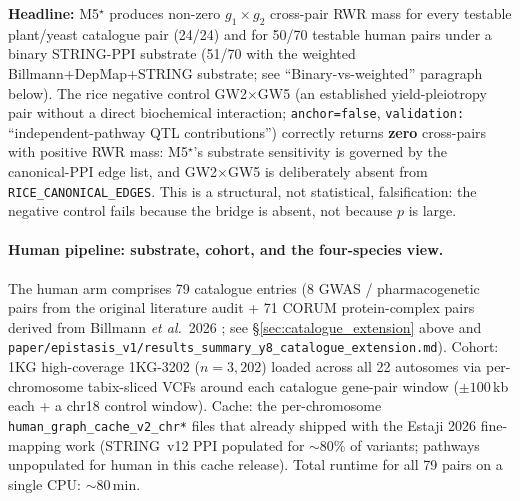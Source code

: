 \textbf{Headline:} M5$^\star$ produces non-zero
$g_1\!\times\!g_2$ cross-pair RWR mass for every testable
plant/yeast catalogue pair (24/24) and for 50/70 testable human pairs
under a binary STRING-PPI substrate (51/70 with the
weighted Billmann+DepMap+STRING substrate; see ``Binary-vs-weighted''
paragraph below). The rice negative control GW2$\times$GW5 (an
established yield-pleiotropy pair without a direct biochemical
interaction; \texttt{anchor=false}, \texttt{validation:}
``independent-pathway QTL contributions'') correctly returns
\textbf{zero} cross-pairs with positive RWR mass: M5$^\star$'s
substrate sensitivity is governed by the canonical-PPI edge list, and
GW2$\times$GW5 is deliberately absent from \texttt{RICE\_CANONICAL\_EDGES}.
This is a structural, not statistical, falsification: the negative
control fails because the bridge is absent, not because $p$ is large.

\paragraph{Human pipeline: substrate, cohort, and the four-species view.}
The human arm comprises 79 catalogue entries (8 GWAS / pharmacogenetic
pairs from the original literature audit + 71 CORUM protein-complex
pairs derived from Billmann \emph{et al.}\ 2026 \cite{billmann2026hap1};
see §\ref{sec:catalogue_extension} above and
\texttt{paper/epistasis\_v1/results\_summary\_y8\_catalogue\_extension.md}).
Cohort: 1KG high-coverage 1KG-3202 ($n=3{,}202$) loaded across all 22
autosomes via per-chromosome tabix-sliced VCFs around each catalogue
gene-pair window ($\pm 100\,$kb each + a chr18 control window). Cache:
the per-chromosome \texttt{human\_graph\_cache\_v2\_chr*} files that
already shipped with the Estaji 2026 fine-mapping work
(STRING~v12 PPI populated for $\sim 80$\% of variants; pathways
unpopulated for human in this cache release). Total runtime for all 79
pairs on a single CPU: $\sim 80\,$min.

